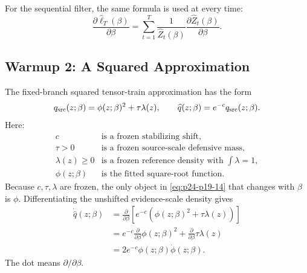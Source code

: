 \documentclass[11pt]{article}
\numberwithin{equation}{section}
\newcommand{\widehatell}{\widehat\ell}
\begin{document}
For the sequential filter, the same formula is used at every time:
\begin{equation}
    \frac{\partial\widehatell_T(\beta)}{\partial\beta}
    =
    \sum_{t=1}^{T}
    \frac{1}{\widehat Z_t(\beta)}
    \frac{\partial\widehat Z_t(\beta)}{\partial\beta}.
    \label{eq:p24-p19-13}
\end{equation}

\subsection{Warmup 2: A Squared Approximation}

The fixed-branch squared tensor-train approximation has the form
\begin{equation}
    q_{\rm src}(z;\beta)
    =
    \phi(z;\beta)^2+\tau\lambda(z),
    \qquad
    \widehat q(z;\beta)=e^{-c}q_{\rm src}(z;\beta).
    \label{eq:p24-p19-14}
\end{equation}
Here:
\begin{equation}
\begin{array}{ll}
c & \text{is a frozen stabilizing shift},\\
\tau>0 & \text{is a frozen source-scale defensive mass},\\
\lambda(z)\ge0 & \text{is a frozen reference density with }\int\lambda=1,\\
\phi(z;\beta) & \text{is the fitted square-root function.}
\end{array}
\label{eq:p24-p19-15}
\end{equation}
Because \(c,\tau,\lambda\) are frozen, the only object in \eqref{eq:p24-p19-14} that changes
with \(\beta\) is \(\phi\).  Differentiating the unshifted evidence-scale
density gives
\begin{equation}
\begin{aligned}
    \dot{\widehat q}(z;\beta)
    &=
    \frac{\partial}{\partial\beta}
    \left[
    e^{-c}\left(\phi(z;\beta)^2+\tau\lambda(z)\right)
    \right]\\
    &=
    e^{-c}
    \frac{\partial}{\partial\beta}\phi(z;\beta)^2
    +
    \frac{\partial}{\partial\beta}\tau\lambda(z)\\
    &=
    2e^{-c}\phi(z;\beta)\dot\phi(z;\beta).
\end{aligned}
\label{eq:p24-p19-16}
\end{equation}
The dot means \(\partial/\partial\beta\).
\end{document}
